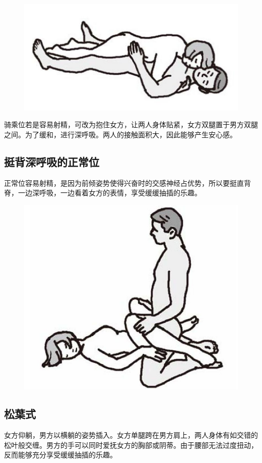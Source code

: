 \documentclass[12pt,UTF8]{ctexbook}
\begin{document}
\begin{figure}[htbp]
	\centering
	\includegraphics[width=0.7\linewidth]{tw1}
	\caption{}
	\label{fig:1}
\end{figure}

骑乘位若是容易射精，可改为抱住女方，让两人身体贴紧，女方双腿置于男方双腿之间。为了缓和，进行深呼吸。两人的接触面积大，因此能够产生安心感。

\subsection{挺背深呼吸的正常位}

正常位容易射精，是因为前倾姿势使得兴奋时的交感神经占优势，所以要挺直背脊，一边深呼吸，一边看着女方的表情，享受缓缓抽插的乐趣。

\begin{figure}[htbp]
	\centering
	\includegraphics[width=0.7\linewidth]{tw2}
	\caption{}
	\label{fig:1}
\end{figure}

\subsection{松葉式}

女方仰躺，男方以横躺的姿势插入。女方单腿跨在男方肩上，两人身体有如交错的松叶般交缠。男方的手可以同时爱抚女方的胸部或阴蒂。由于腰部无法过度扭动，反而能够充分享受缓缓抽插的乐趣。
\end{document}
